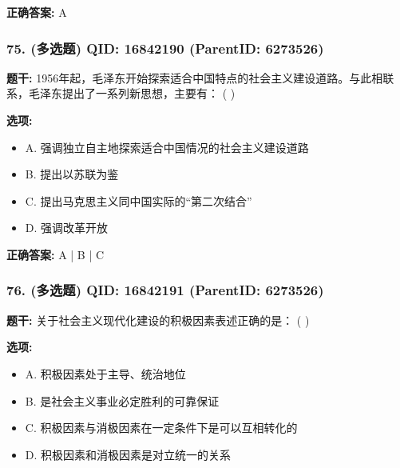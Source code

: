 \documentclass[12pt,UTF8]{ctexart}
\begin{document}
\textbf{正确答案:}
A

\vspace{0.3em}\hrulefill\vspace{0.7em}

\subsubsection*{75. (多选题) \small QID: 16842190 (ParentID: 6273526)}

\textbf{题干:}
1956年起，毛泽东开始探索适合中国特点的社会主义建设道路。与此相联系，毛泽东提出了一系列新思想，主要有： ( )



\textbf{选项:}
\begin{itemize}[leftmargin=*]

  \item A. 强调独立自主地探索适合中国情况的社会主义建设道路

  \item B. 提出以苏联为鉴

  \item C. 提出马克思主义同中国实际的“第二次结合”

  \item D. 强调改革开放

\end{itemize}

\textbf{正确答案:}
A | B | C

\vspace{0.3em}\hrulefill\vspace{0.7em}

\subsubsection*{76. (多选题) \small QID: 16842191 (ParentID: 6273526)}

\textbf{题干:}
关于社会主义现代化建设的积极因素表述正确的是： ( )



\textbf{选项:}
\begin{itemize}[leftmargin=*]

  \item A. 积极因素处于主导、统治地位

  \item B. 是社会主义事业必定胜利的可靠保证

  \item C. 积极因素与消极因素在一定条件下是可以互相转化的

  \item D. 积极因素和消极因素是对立统一的关系

\end{itemize}
\end{document}
